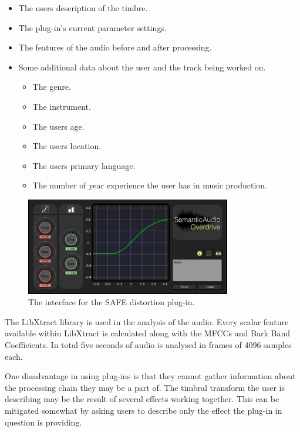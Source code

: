 		\begin{itemize}
			\item The users description of the timbre.
			\item The plug-in's current parameter settings.
			\item The features of the audio before and after processing.
			\item Some additional data about the user and the track being worked on.
			\begin{itemize}
				\item The genre.
				\item The instrument.
				\item The users age.
				\item The users location.
				\item The users primary language.
				\item The number of year experience the user has in music production.
			\end{itemize}
		\end{itemize}

		\begin{figure}[h!]
			\centering
			\includegraphics[width=0.8\textwidth]{chapter4/Images/SAFEDistortion.png}
			\caption{The interface for the SAFE distortion plug-in.}
			\label{fig:SAFE-Distortion}
		\end{figure}

		The LibXtract library \citep{bullock2007libxtract} is used in the analysis of the audio. Every scalar
		feature available within LibXtract is calculated along with the MFCCs and Bark Band Coefficients. In total
		five seconds of audio is analysed in frames of 4096 samples each.



		One disadvantage in using plug-ins is that they cannot gather information about the processing chain they
		may be a part of. The timbral transform the user is describing may be the result of several effects working
		together. This can be mitigated somewhat by asking users to describe only the effect the plug-in in question
		is providing.

